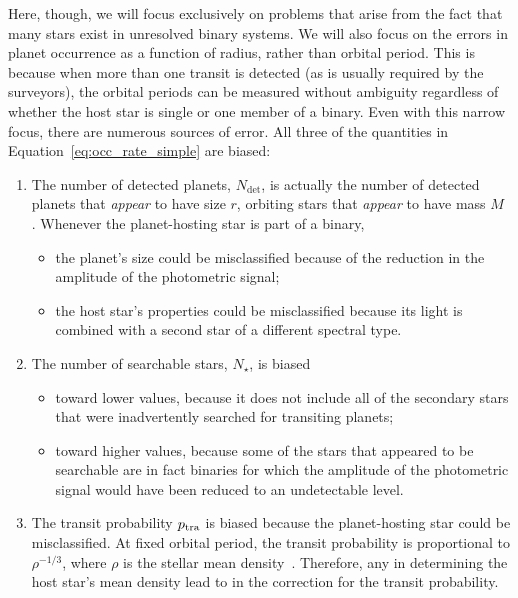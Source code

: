 \documentclass[12pt,modern,trackchanges]{aastex61}
\begin{document}
Here, though, we will focus exclusively on problems that arise from
the fact that many stars exist in unresolved binary systems.  We will
also focus on the errors in planet occurrence as a function of radius,
rather than orbital period. This is because when more than one transit
is detected (as is usually required by the surveyors), the orbital
periods can be measured without ambiguity regardless of whether the
host star is single or one member of a binary.  Even with this narrow
focus, there are numerous sources of error.  All three of the
quantities in Equation~\ref{eq:occ_rate_simple} are biased:
\begin{enumerate}
%    
    \item The number of detected planets, $N_{\det}$, is actually the
      number of detected planets that {\it appear} to have size $r$,
      orbiting stars that {\it appear} to have mass $M$ .  Whenever the planet-hosting star is part of a
      binary,
%    
    \begin{itemize}
        \item the planet's size could be misclassified because of the
          reduction in the amplitude of the photometric signal;
%        
        \item the host star's properties could be misclassified
          because its light is combined with a second star of a
          different spectral type.
%        
    \end{itemize}
%    
    \item The number of searchable stars, $N_\star$, is biased
%    
    \begin{itemize}
%        
        \item toward lower values, because it does not include all of
          the secondary stars that were inadvertently searched for
          transiting planets;
%        
        \item toward higher values, because some of the stars that
          appeared to be searchable are in fact binaries for which the
          amplitude of the photometric signal would have been reduced
          to an undetectable level.
%        
    \end{itemize}
%    
    \item The transit probability $p_{\rm tra}$ is biased because the
      planet-hosting star could be misclassified.  At fixed orbital
      period, the transit probability is proportional to
      $\rho^{-1/3}$, where $\rho$ is the stellar mean
      density~\citep{Winn2010}.  Therefore, any 
       in determining
      the host star's mean density lead to 
       in the correction
      for the transit probability.
%    
\end{enumerate}
\end{document}

